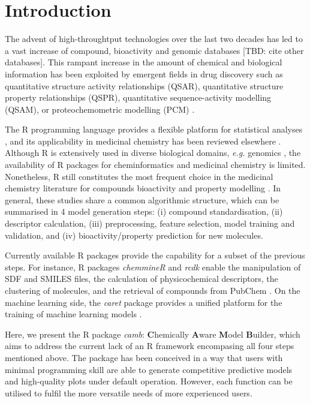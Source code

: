 \documentclass{bioinfo}
\begin{document}
\section{Introduction}

The advent of high-throughtput technologies over the last two decades 
has led to a vast increase of compound, bioactivity
and genomic databases \citep{bender_databases} [TBD: cite other databases].
This rampant increase in the amount of chemical and biological information 
has been exploited by emergent fields in drug discovery 
such as quantitative structure activity relationships (QSAR), quantitative structure property relationships (QSPR), quantitative sequence-activity modelling (QSAM), or proteochemometric modelling (PCM) \citep{review_pcm}.

The R programming language provides a flexible platform for statistical analyses \citep{Rlanguage},
and its applicability in medicinal chemistry has been reviewed elsewhere \citep{mente}.
Although R is extensively used in diverse biological domains, {\it e.g.} genomics \citep{bioconductor},
the availability of R packages for cheminformatics and medicinal chemistry is limited. %
Nonetheless, R still constitutes the most frequent choice in the medicinal chemistry literature
for compounds bioactivity and property modelling \citep{mente}.
In general, these studies share a common algorithmic structure, which can be summarised in 4 model generation steps:
(i) compound standardisation, (ii) descriptor calculation,
(iii) preprocessing, feature selection, model training and validation, and (iv) bioactivity/property prediction for new molecules.

Currently available R packages provide the capability for a subset of the previous steps.
For instance, R packages {\it chemmineR} \citep{chemmineR} and {\it rcdk} \citep{rcdk} enable the manipulation of SDF and SMILES
files, the calculation of physicochemical descriptors, the clustering of molecules,
and the retrieval of compounds from PubChem \citep{pubchem}.
On the machine learning side, the {\it caret} package provides a
unified platform for the training of machine learning models \citep{caret}.

Here, we present the R package {\it camb}: {\bf C}hemically {\bf A}ware {\bf M}odel {\bf B}uilder,
which aims to address the current lack of an R framework encompasing all four steps mentioned above.
The package has been conceived in a way that users with minimal
programming skill are able to generate competitive predictive models and high-quality plots
under default operation.
However, each function can be utilised to fulfil the more versatile needs of more experienced users.
\end{document}
